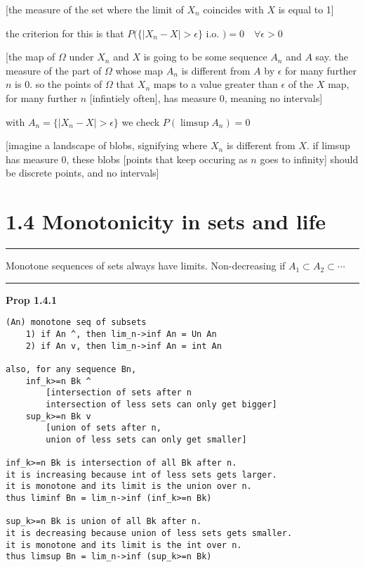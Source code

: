 \documentclass{article}
\begin{document}
\begin{flushleft}
\bigbreak

[the measure of the set where the limit of $X_n$ coincides with $X$ is equal to 1]

\bigbreak

the criterion for this is that $P( \{ |X_n-X| > \epsilon \}$ i.o. $) = 0 \quad \forall \epsilon > 0$

\bigbreak

[the map of $\Omega$ under $X_n$ and $X$ is going to be some sequence $A_n$ and $A$ say. the measure of the part of $\Omega$ whose map $A_n$ is different from $A$ by $\epsilon$ for many further $n$ is 0. so the points of $\Omega$ that $X_n$ maps to a value greater than $\epsilon$ of the $X$ map, for many further $n$ [infintiely often], has measure 0, meaning no intervals]

\bigbreak

with $A_n = \{ |X_n-X|>\epsilon \}$ we check $P( \limsup A_n ) = 0$

\bigbreak

[imagine a landscape of blobs, signifying where $X_n$ is different from $X$. if limsup has measure 0, these blobs [points that keep occuring as $n$ goes to infinity] should be discrete points, and no intervals]

\bigbreak

\section*{1.4 Monotonicity in sets and life}
\bigbreak
\hrule
\bigbreak

Monotone sequences of sets always have limits. Non-decreasing if $A_1 \subset A_2 \subset \dotsb$

\bigbreak
\hrule
\bigbreak
\textbf{Prop 1.4.1}
\begin{verbatim}
(An) monotone seq of subsets
    1) if An ^, then lim_n->inf An = Un An
    2) if An v, then lim_n->inf An = int An

also, for any sequence Bn, 
    inf_k>=n Bk ^
        [intersection of sets after n
        intersection of less sets can only get bigger]
    sup_k>=n Bk v
        [union of sets after n,
        union of less sets can only get smaller]

inf_k>=n Bk is intersection of all Bk after n.
it is increasing because int of less sets gets larger. 
it is monotone and its limit is the union over n.
thus liminf Bn = lim_n->inf (inf_k>=n Bk)

sup_k>=n Bk is union of all Bk after n.
it is decreasing because union of less sets gets smaller.
it is monotone and its limit is the int over n.
thus limsup Bn = lim_n->inf (sup_k>=n Bk)


\end{verbatim}
\end{flushleft}
\end{document}
